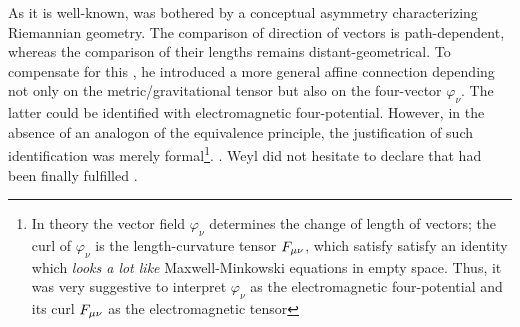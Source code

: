\documentclass[draft]{article}
\newcommand{\phin}{\ensuremath{\varphi_\nu}\xspace}
\renewcommand{\fmn}{\ensuremath{F\mn}\xspace}
\begin{document}
As it is well-known, \citet{Weyl1918b,Weyl1918a,Weyl1919a} was bothered by a conceptual asymmetry characterizing Riemannian geometry. The comparison of direction of vectors is path-dependent, whereas the comparison of their lengths remains distant-geometrical. To compensate for this  \citep{Afriat2009}, he introduced a more general affine connection depending not only on the metric/gravitational tensor \gmn but also on the four-vector \phin. The latter could be identified with electromagnetic four-potential. However, in the absence of an analogon of the equivalence principle, the justification of such identification was merely formal\footnote{In  theory the vector field \phin determines the change of length of vectors;  the curl of \phin is the length-curvature tensor \fmn, which satisfy satisfy an identity which \emph{looks a lot like} Maxwell-Minkowski equations in empty space. Thus, it was very suggestive to interpret \phin as the electromagnetic four-potential and its curl \fmn as the electromagnetic tensor}. . Weyl did not hesitate to declare that  had been finally fulfilled \citep[263]{Weyl1919}.
\end{document}
